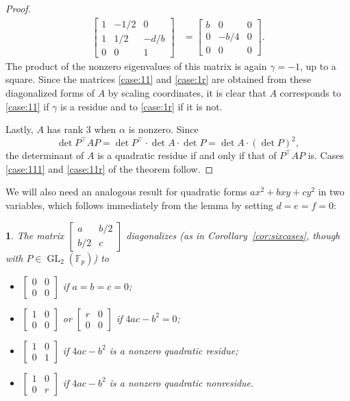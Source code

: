 \documentclass[10pt,a4paper]{amsart}
\numberwithin{equation}{section}
\numberwithin{figure}{section}
\numberwithin{table}{section}
\theoremstyle{definition}
\theoremstyle{plain}
\theoremstyle{remark}
\theoremstyle{plain}
\newtheorem{cor}[thm]{\protect\corollaryname}
\theoremstyle{definition}
\theoremstyle{plain}
\theoremstyle{plain}
\providecommand{\corollaryname}{Corollary}
\newcommand{\F}{\mathbb{F}}
\newcommand{\GL}{\operatorname{GL}}
\newcommand{\trsp}[1]{{{#1}^{\top}\!\!}}
\begin{document}
\begin{proof}
\begin{align*}
\begin{bmatrix}
		1 & -1/2 & 0\\
		1 & 1/2 & -d/b\\
		0 & 0 & 1
		\end{bmatrix}
		&=
		\begin{bmatrix}
		b&0&0\\
		0&-b/4&0\\
		0&0&0
		\end{bmatrix}.
		\end{align*}
		The product of the nonzero eigenvalues of this matrix is again $\gamma=-1$, up to a square. Since the matrices \eqref{case:11} and \eqref{case:1r} are obtained from these diagonalized forms of $A$ by scaling coordinates, it is clear that $A$ corresponds to \eqref{case:11} if $\gamma$ is a residue and to \eqref{case:1r} if it is not.
		
		Lastly, $A$ has rank $3$ when $\alpha$ is nonzero. Since
		\begin{equation*}
		\det \trsp{P}AP=\det \trsp{P} \cdot\det A\cdot\det P=\det A\cdot(\det P)^2,
		\end{equation*}
		the determinant of $A$ is a quadratic residue if and only if that of $\trsp{P}AP$ is. Cases \eqref{case:111} and \eqref{case:11r} of the theorem follow.
	\end{proof}
	
	We will also need an analogous result for quadratic forms $ax^2+bxy+cy^2$ in two variables, which follows immediately from the lemma by setting $d=e=f=0$:
	\begin{cor}\label{cor:diag-P1}
		The matrix $\left[\begin{smallmatrix}a&b/2\\b/2&c\end{smallmatrix}\right]$ diagonalizes (as in Corollary~\ref{cor:sixcases}, though with $P \in \GL_2(\F_p)$) to
		\begin{itemize}
			\item $\left[\begin{smallmatrix}0&0\\0&0\end{smallmatrix}\right]$ if $a=b=c=0$;
			\item $\left[\begin{smallmatrix}1&0\\0&0\end{smallmatrix}\right]$ or $\left[\begin{smallmatrix}r&0\\0&0\end{smallmatrix}\right]$ if $4ac-b^2=0$;
			\item $\left[\begin{smallmatrix}1&0\\0&1\end{smallmatrix}\right]$ if $4ac-b^2$ is a nonzero quadratic residue;
			\item $\left[\begin{smallmatrix}1&0\\0&r\end{smallmatrix}\right]$ if $4ac-b^2$ is a nonzero quadratic nonresidue.
		\end{itemize}
	\end{cor}
	
\end{document}
